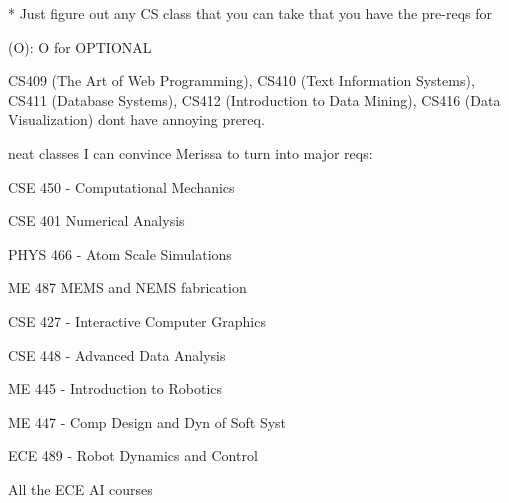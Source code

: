 \documentclass{article}
\newcommand{\hp}{\hspace{1cm}}
\begin{document}

* Just figure out any CS class that you can take that you have the pre-reqs for 

(O): O for OPTIONAL


CS409 (The Art of Web Programming), CS410 (Text Information Systems), CS411 (Database Systems), CS412 (Introduction to Data Mining), CS416 (Data Visualization) dont have annoying prereq.



neat classes I can convince Merissa to turn into major reqs:

CSE 450 - Computational Mechanics

CSE 401 Numerical Analysis

PHYS 466 - Atom Scale Simulations 

ME 487 MEMS and NEMS fabrication 

CSE 427 - Interactive Computer Graphics 

CSE 448 - Advanced Data Analysis 

ME 445 - Introduction to Robotics 

ME 447 - Comp Design and Dyn of Soft Syst

ECE 489 - Robot Dynamics and Control 

All the ECE AI courses 
\end{document}
